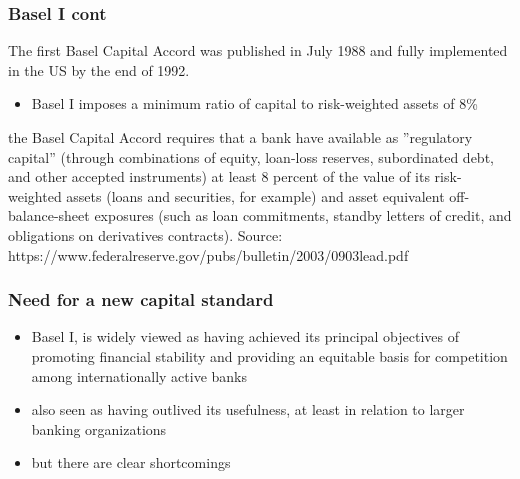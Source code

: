 \documentclass[11pt]{beamer}
\begin{document}
\begin{frame}
\frametitle{Basel I cont}
The first Basel Capital Accord was published in July 1988 and fully implemented in the US by the end of 1992.
\begin{itemize}
\item Basel I imposes a minimum ratio of capital to risk-weighted assets of $8$\%
\end{itemize}
the Basel Capital Accord requires that a bank have available as ''regulatory capital'' (through combinations of equity, loan-loss reserves, subordinated debt, and other accepted instruments) at
least 8 percent of the value of its risk-weighted assets (loans and securities, for example) and asset equivalent off-balance-sheet exposures (such as loan commitments, standby letters of credit, and obligations on derivatives contracts).
\tiny{Source: https://www.federalreserve.gov/pubs/bulletin/2003/0903lead.pdf}
\end{frame}


\begin{frame}
\frametitle{Need for a new capital standard}
\begin{itemize}
\item Basel I, is widely viewed as having achieved its principal objectives of promoting financial stability and providing an equitable basis for competition among internationally active banks
\item also seen as having outlived its usefulness, at
least in relation to larger banking organizations
\item but there are clear shortcomings
\end{itemize}
\end{frame}
\end{document}
